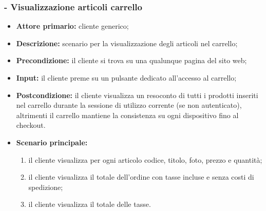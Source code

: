 \subsubsection{ - Visualizzazione articoli carrello}
\begin{itemize}
    \item \textbf{Attore primario:} cliente generico;
    \item \textbf{Descrizione:} scenario per la visualizzazione degli articoli nel carrello;
    \item \textbf{Precondizione:} il cliente si trova su una qualunque pagina del sito web;
    \item \textbf{Input:} il cliente preme su un pulsante dedicato all'accesso al carrello;
    \item \textbf{Postcondizione:} il cliente visualizza un resoconto di tutti i prodotti inseriti nel carrello durante la sessione di utilizzo corrente (se non autenticato), altrimenti il carrello mantiene la consistenza su ogni dispositivo fino al checkout.
    \item \textbf{Scenario principale:}
          \begin{enumerate}
              \item il cliente visualizza per ogni articolo codice, titolo, foto, prezzo e quantità;
              \item il cliente visualizza il totale dell'ordine con tasse incluse e senza costi di spedizione;
              \item il cliente visualizza il totale delle tasse.
          \end{enumerate}
    
\end{itemize}

\stepsubUserCase
